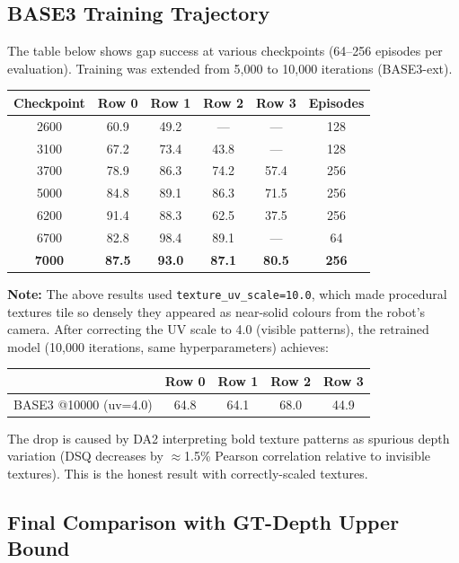\documentclass[11pt,a4paper]{article}
\newcommand{\best}[1]{\textcolor{best}{\textbf{#1}}}
\begin{document}
\subsection{BASE3 Training Trajectory}

The table below shows gap success at various checkpoints (64--256 episodes
per evaluation).  Training was extended from 5{,}000 to 10{,}000 iterations
(BASE3-ext).

\begin{center}
\begin{tabular}{c cccc c}
\toprule
Checkpoint & Row 0 & Row 1 & Row 2 & Row 3 & Episodes \\
\midrule
2600 & 60.9 & 49.2 & --- & --- & 128 \\
3100 & 67.2 & 73.4 & 43.8 & --- & 128 \\
3700 & 78.9 & 86.3 & 74.2 & 57.4 & 256 \\
5000 & 84.8 & 89.1 & 86.3 & 71.5 & 256 \\
6200 & 91.4 & 88.3 & 62.5 & 37.5 & 256 \\
6700 & 82.8 & 98.4 & 89.1 & --- & 64 \\
\best{7000} & \best{87.5} & \best{93.0} & \best{87.1} & \best{80.5} & \best{256} \\
\bottomrule
\end{tabular}
\end{center}

\textbf{Note:} The above results used \texttt{texture\_uv\_scale=10.0}, which made
procedural textures tile so densely they appeared as near-solid colours from the
robot's camera.  After correcting the UV scale to 4.0 (visible patterns), the
retrained model (10{,}000 iterations, same hyperparameters) achieves:

\begin{center}
\begin{tabular}{l cccc}
\toprule
& Row 0 & Row 1 & Row 2 & Row 3 \\
\midrule
BASE3 @10000 (uv=4.0) & 64.8 & 64.1 & 68.0 & 44.9 \\
\bottomrule
\end{tabular}
\end{center}

The drop is caused by DA2 interpreting bold texture patterns as spurious depth
variation (DSQ decreases by $\approx$1.5\% Pearson correlation relative to
invisible textures).  This is the honest result with correctly-scaled textures.

\subsection{Final Comparison with GT-Depth Upper Bound}
\end{document}

